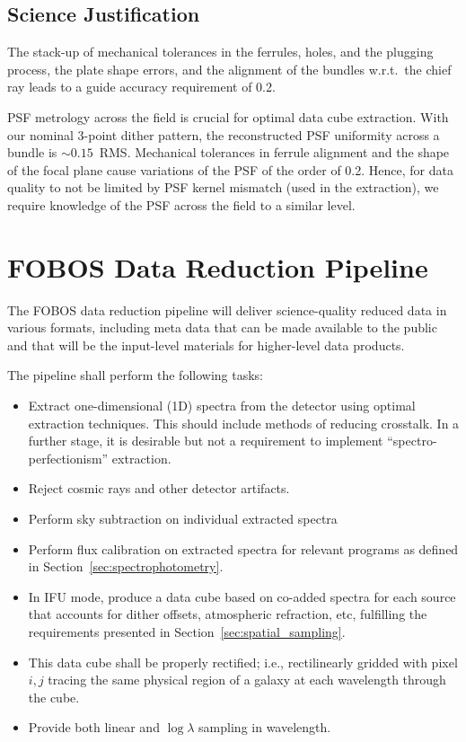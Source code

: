 \documentclass[preprint,11pt]{aastex}
\begin{document}
\subsection{Science Justification}

The stack-up of mechanical tolerances in the ferrules, holes, and the
plugging process, the plate shape errors, and the alignment of the
bundles w.r.t.\ the chief ray leads to a guide accuracy requirement of
0.2\arcsec.

PSF metrology across the field is crucial for optimal data cube extraction. With
our nominal 3-point dither pattern, the reconstructed PSF uniformity across a 
bundle is $\sim 0.15$\arcsec\ RMS. Mechanical tolerances in ferrule alignment and  the
shape of the focal plane cause variations of the PSF of the order of 0.2\arcsec. 
Hence, for data quality to not be limited by PSF kernel mismatch (used in the
extraction),  we require knowledge of the PSF across the field to a similar level.

\section{FOBOS Data Reduction Pipeline} \label{sec:data_reduction_pipeline}

The FOBOS data reduction pipeline will deliver science-quality reduced
data in various formats, including meta data that can be made available
to the public and that will be the input-level materials for
higher-level data products. 

The pipeline shall perform the following tasks:
\begin{itemize}
\item Extract one-dimensional (1D) spectra from the detector using
  optimal extraction techniques. This should include methods of
  reducing crosstalk. In a further stage, it is desirable but not a
  requirement to implement ``spectro-perfectionism'' extraction.
\item Reject cosmic rays and other detector artifacts.
\item Perform sky subtraction on individual extracted spectra
\item Perform flux calibration on extracted spectra for relevant programs as
   defined in Section~\ref{sec:spectrophotometry}.
\item In IFU mode, produce a data cube based on co-added spectra for each source
  that accounts for dither offsets, atmospheric refraction, etc,
  fulfilling the requirements presented in
  Section~\ref{sec:spatial_sampling}.
\item This data cube shall be properly rectified; i.e., rectilinearly
  gridded with pixel $i,j$ tracing the same physical region of a galaxy
  at each wavelength through the cube.
\item Provide both linear and $\log \lambda$ sampling in wavelength.
\end{itemize}
\end{document}
